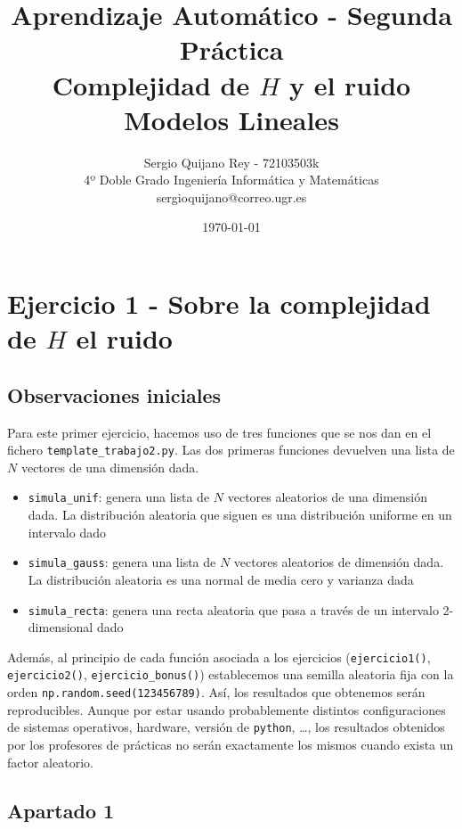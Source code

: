 \documentclass[11pt]{article}
\title{
    {Aprendizaje Automático - Segunda Práctica}\\
    {Complejidad de $H$ y el ruido}\\
    {Modelos Lineales}
}
\author{
    {Sergio Quijano Rey - 72103503k}\\
    {4º Doble Grado Ingeniería Informática y Matemáticas}\\
    {sergioquijano@correo.ugr.es}
}
\date{\today}
\begin{document}
\maketitle
\pagebreak

\tableofcontents
\pagebreak

\section{Ejercicio 1 - Sobre la complejidad de $H$ el ruido}

\subsection{Observaciones iniciales}

Para este primer ejercicio, hacemos uso de tres funciones que se nos dan en el fichero \lstinline{template_trabajo2.py}. Las dos primeras funciones devuelven una lista de $N$ vectores de una dimensión dada.

\begin{itemize}
    \item \lstinline{simula_unif}: genera una lista de $N$ vectores aleatorios de una dimensión dada. La distribución aleatoria que siguen es una distribución uniforme en un intervalo dado
    \item \lstinline{simula_gauss}: genera una lista de $N$ vectores aleatorios de dimensión dada. La distribución aleatoria es una normal de media cero y varianza dada
    \item \lstinline{simula_recta}: genera una recta aleatoria que pasa a través de un intervalo 2-dimensional dado
\end{itemize}

Además, al principio de cada función asociada a los ejercicios (\lstinline{ejercicio1()}, \lstinline{ejercicio2()}, \lstinline{ejercicio_bonus()}) establecemos una semilla aleatoria fija con la orden \lstinline{np.random.seed(123456789)}. Así, los resultados que obtenemos serán reproducibles. Aunque por estar usando probablemente distintos configuraciones de sistemas operativos, hardware, versión de \lstinline{python}, \ldots, los resultados obtenidos por los profesores de prácticas no serán exactamente los mismos cuando exista un factor aleatorio.

\subsection{Apartado 1}
\end{document}
